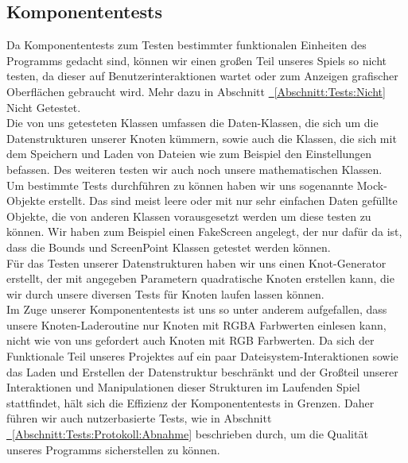 %



\newpage



\label{Abschnitt:Tests:Protokoll:Komponenten}



\subsection*{Komponententests}


Da Komponententests zum Testen bestimmter funktionalen Einheiten des Programms gedacht sind, können wir einen großen Teil unseres Spiels so nicht testen, da dieser auf Benutzerinteraktionen wartet oder zum Anzeigen grafischer Oberflächen gebraucht wird. 
Mehr dazu in Abschnitt \hyperref[Abschnitt:Tests:Nicht:Komponenten]{\mousecursor~\ref{Abschnitt:Tests:Nicht}} \glqq Nicht Getestet\grqq.\\

Die von uns getesteten Klassen umfassen die Daten-Klassen, die sich um die Datenstrukturen unserer Knoten kümmern, sowie auch die Klassen, die sich mit dem Speichern und Laden von Dateien wie zum Beispiel den Einstellungen befassen.
Des weiteren testen wir auch noch unsere mathematischen Klassen.\\

Um bestimmte Tests durchführen zu können haben wir uns sogenannte Mock-Objekte erstellt. Das sind meist leere oder mit nur sehr einfachen Daten gefüllte Objekte, die von anderen Klassen vorausgesetzt werden um diese testen zu können. Wir haben zum Beispiel einen FakeScreen angelegt, der nur dafür da ist, dass die Bounds und ScreenPoint Klassen getestet werden können.\\

Für das Testen unserer Datenstrukturen haben wir uns einen Knot-Generator erstellt, der mit angegeben Parametern quadratische Knoten erstellen kann, die wir  durch unsere diversen Tests für Knoten laufen lassen können.\\

Im Zuge unserer Komponententests ist uns so unter anderem aufgefallen, dass unsere Knoten-Laderoutine nur Knoten mit RGBA Farbwerten einlesen kann, nicht wie von uns gefordert auch Knoten mit RGB Farbwerten. Da sich der Funktionale Teil unseres Projektes auf ein paar Dateisystem-Interaktionen sowie das Laden und Erstellen der Datenstruktur beschränkt und der Großteil unserer Interaktionen und Manipulationen dieser Strukturen im Laufenden Spiel stattfindet, hält sich die Effizienz der Komponententests in Grenzen. Daher führen wir auch nutzerbasierte Tests, wie in Abschnitt \hyperref[Abschnitt:Tests:Protokoll:Abnahme]{\mousecursor~\ref{Abschnitt:Tests:Protokoll:Abnahme}} beschrieben durch, um die Qualität unseres Programms sicherstellen zu können.

